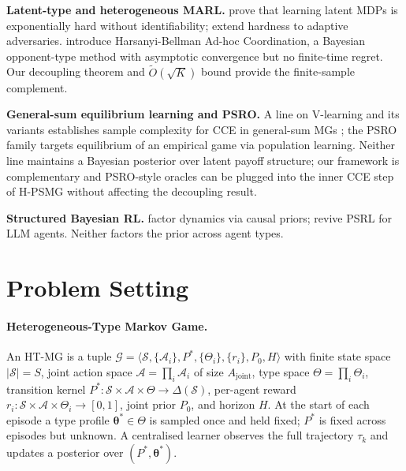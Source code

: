 \textbf{Latent-type and heterogeneous MARL.} \citet{kwon2021rl} prove that learning latent MDPs is exponentially hard without identifiability; \citet{tian2024learning} extend hardness to adaptive adversaries. \citet{albrecht2013game,albrecht2019convergence} introduce Harsanyi-Bellman Ad-hoc Coordination, a Bayesian opponent-type method with asymptotic convergence but no finite-time regret. Our decoupling theorem and $\tilde O(\sqrt K)$ bound provide the finite-sample complement.

\textbf{General-sum equilibrium learning and PSRO.} A line on V-learning and its variants establishes sample complexity for CCE in general-sum MGs \citep{jin2021v,song2022when,mao2023decentralized,erez2023regret,cui2025incentivize}; the PSRO family \citep{lanctot2017unified,muller2019generalized,mcaleer2020pipeline,marris2021multi,mcaleer2021xdo,mcaleer2022anytime,dinh2022online,zhou2022efficient,yao2023policy} targets equilibrium of an empirical game via population learning. Neither line maintains a Bayesian posterior over latent payoff structure; our framework is complementary and PSRO-style oracles can be plugged into the inner CCE step of H-PSMG without affecting the decoupling result.

\textbf{Structured Bayesian RL.} \citet{mutti2024exploiting} factor dynamics via causal priors; \citet{arumugam2026toward} revive PSRL for LLM agents. Neither factors the prior across agent types.

\section{Problem Setting}
\label{sec:setting}

\paragraph{Heterogeneous-Type Markov Game.}
An HT-MG is a tuple
$\mathcal{G} = \langle \mathcal{S}, \{\mathcal{A}_i\}, P^*, \{\Theta_i\}, \{r_i\}, P_0, H \rangle$
with finite state space $|\mathcal S|=S$, joint action space $\mathcal A=\prod_i \mathcal A_i$ of size $A_{\mathrm{joint}}$, type space $\Theta=\prod_i \Theta_i$, transition kernel $P^*\!:\!\mathcal S\!\times\!\mathcal A\!\times\!\Theta\to\Delta(\mathcal S)$, per-agent reward $r_i\!:\!\mathcal S\!\times\!\mathcal A\!\times\!\Theta_i\!\to\![0,1]$, joint prior $P_0$, and horizon $H$. At the start of each episode a type profile $\boldsymbol\theta^* \in \Theta$ is sampled once and held fixed; $P^*$ is fixed across episodes but unknown. A centralised learner observes the full trajectory $\tau_k$ and updates a posterior over $(P^*, \boldsymbol\theta^*)$.

